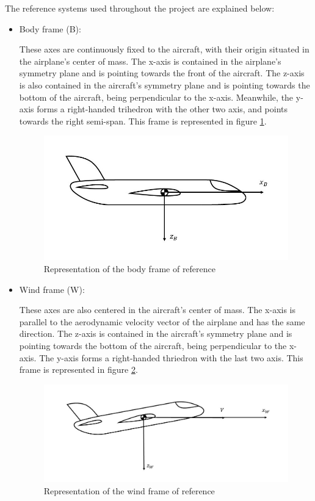 The reference systems used throughout the project are explained below: 

\begin{itemize}

\item Body frame (B): 

These axes are continuously fixed to the aircraft, with their origin situated in the airplane's center of mass. The x-axis is contained in the airplane's symmetry plane and is pointing towards the front of the aircraft. The z-axis is also contained in the aircraft's symmetry plane and is pointing towards the bottom of the aircraft, being perpendicular to the x-axis. Meanwhile, the y-axis forms a right-handed trihedron with the other two axis, and points towards the right semi-span. This frame is represented in figure \ref{fig:B_frame}.

\begin{figure}
\centering
\includegraphics[scale=0.4]{Images/B_frame.jpg}
\caption{Representation of the body frame of reference}
\label{fig:B_frame}
\end{figure}

\item Wind frame (W):

These axes are also centered in the aircraft's center of mass. The x-axis is parallel to the aerodynamic velocity vector of the airplane and has the same direction. The z-axis is contained in the aircraft's symmetry plane and is pointing towards the bottom of the aircraft, being perpendicular to the x-axis. The y-axis forms a right-handed thriedron with the last two axis. This frame is represented in figure \ref{fig:W_frame}.

\begin{figure}
\centering
\includegraphics[scale=0.4]{Images/W_frame.jpg}
\caption{Representation of the wind frame of reference}
\label{fig:W_frame}
\end{figure}


\end{itemize}

